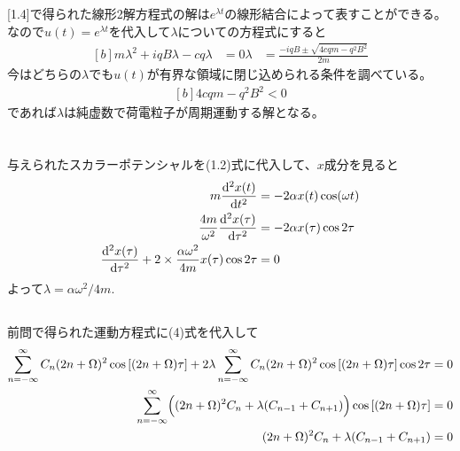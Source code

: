 \documentclass[../ap_2023.tex]{subfiles}
\begin{document}
\subsection{}
[1.4]で得られた線形2解方程式の解は\(e^{\lambda t}\)の線形結合によって表すことができる。
なので\(u(t)=e^{\lambda t}\)を代入して\(\lambda\)についての方程式にすると
\begin{equation}\begin{aligned}[b]
    m\lambda^2 +iqB\lambda -cq\lambda &= 0
    \lambda &= \frac{-iqB\pm\sqrt{4cqm-q^2B^2}}{2m}
\end{aligned}\end{equation}
今はどちらの\(\lambda\)でも\(u(t)\)が有界な領域に閉じ込められる条件を調べている。
\begin{equation}\begin{aligned}[b]
    4cqm-q^2B^2 < 0
\end{aligned}\end{equation}
であれば\(\lambda\)は純虚数で荷電粒子が周期運動する解となる。

\section{}
\subsection{}
与えられたスカラーポテンシャルを(1.2)式に代入して、\(x\)成分を見ると
\begin{equation}\begin{aligned}[b]
    m\dv[2]{x(t)}{t} &= -2\alpha x(t)\cos(\omega t)\\
    \frac{4m}{\omega^2}\dv[2]{x(\tau)}{\tau} &= -2\alpha x(\tau) \cos2\tau\\
    \dv[2]{x(\tau)}{\tau} + 2\times \frac{\alpha\omega^2}{4m}x(\tau)\cos2\tau &= 0
\end{aligned}\end{equation}
よって\(\lambda = \alpha\omega^2/4m\).

\subsection{}
前問で得られた運動方程式に(4)式を代入して
\begin{equation}\begin{aligned}[b]
    \sum_{n=-\infty}^{\infty}C_n(2n+\Omega)^2\cos\qty[(2n+\Omega)\tau]+2\lambda\sum_{n=-\infty}^{\infty}C_n(2n+\Omega)^2\cos\qty[(2n+\Omega)\tau]\cos2\tau &= 0\\
    \sum_{n=-\infty}^{\infty}\Bigl((2n+\Omega)^2C_n+\lambda(C_{n-1}+C_{n+1})\Bigr)\cos\qty[(2n+\Omega)\tau] &=0\\
    (2n+\Omega)^2C_n+\lambda(C_{n-1}+C_{n+1}) &= 0
\end{aligned}\end{equation}
\end{document}
